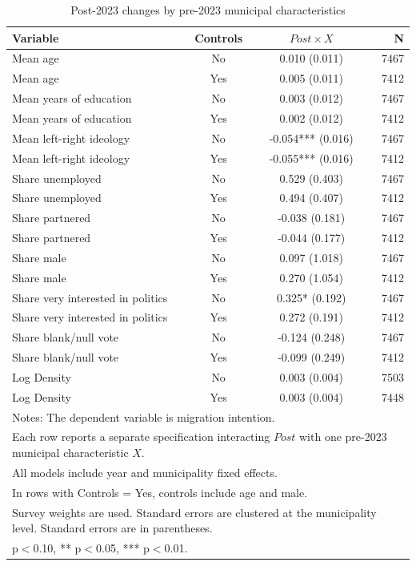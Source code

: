 \begin{table}[!htbp]
\centering
\caption{Post-2023 changes by pre-2023 municipal characteristics}
\label{tab:post_x_key}
\small
\begin{tabular}{lccr}
\hline
Variable & Controls & $Post \times X$ & N \\
\hline
Mean age & No & 0.010 (0.011) & 7467 \\
Mean age & Yes & 0.005 (0.011) & 7412 \\
Mean years of education & No & 0.003 (0.012) & 7467 \\
Mean years of education & Yes & 0.002 (0.012) & 7412 \\
Mean left-right ideology & No & -0.054*** (0.016) & 7467 \\
Mean left-right ideology & Yes & -0.055*** (0.016) & 7412 \\
Share unemployed & No & 0.529 (0.403) & 7467 \\
Share unemployed & Yes & 0.494 (0.407) & 7412 \\
Share partnered & No & -0.038 (0.181) & 7467 \\
Share partnered & Yes & -0.044 (0.177) & 7412 \\
Share male & No & 0.097 (1.018) & 7467 \\
Share male & Yes & 0.270 (1.054) & 7412 \\
Share very interested in politics & No & 0.325* (0.192) & 7467 \\
Share very interested in politics & Yes & 0.272 (0.191) & 7412 \\
Share blank/null vote & No & -0.124 (0.248) & 7467 \\
Share blank/null vote & Yes & -0.099 (0.249) & 7412 \\
Log Density & No & 0.003 (0.004) & 7503 \\
Log Density & Yes & 0.003 (0.004) & 7448 \\
\hline
\multicolumn{4}{l}{\footnotesize Notes: The dependent variable is migration intention.} \\
\multicolumn{4}{l}{\footnotesize Each row reports a separate specification interacting $Post$ with one pre-2023 municipal characteristic $X$.} \\
\multicolumn{4}{l}{\footnotesize All models include year and municipality fixed effects.} \\
\multicolumn{4}{l}{\footnotesize In rows with Controls = Yes, controls include age and male.} \\
\multicolumn{4}{l}{\footnotesize Survey weights are used. Standard errors are clustered at the municipality level. Standard errors are in parentheses.} \\
\multicolumn{4}{l}{\footnotesize * p$<$0.10, ** p$<$0.05, *** p$<$0.01.} \\
\end{tabular}
\end{table}
